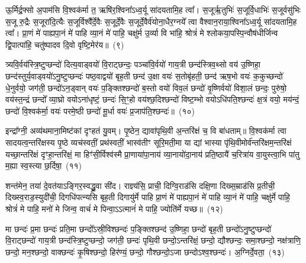 ऊ॒र्मिर्द्र॒फ्सो अ॒पाम॑सि वि॒श्वक॑र्मा त॒ ऋषि॑र॒श्विना᳚\-ऽ\-ध्व॒र्यू सा॑दयता\-मि॒ह त्वा᳚। स॒जूर्\mbox{}ऋ॒तुभिः॑ स॒जूर्वि॒धाभिः॑ स॒जूर्वसु॑भिः स॒जू रु॒द्रैः स॒जूरा॑दि॒त्यैः स॒जूर्विश्वै᳚र्दे॒वैः स॒जूर्दे॒वैः स॒जूर्दे॒वैर्व॑योना॒धैर॒ग्नये᳚ त्वा वैश्वान॒राया॒श्विना᳚\-ऽ\-ध्व॒र्यू सा॑दयतामि॒ह त्वा᳚। प्रा॒णं मे॑ पाह्यपा॒नं मे॑ पाहि व्या॒नं मे॑ पाहि॒ चक्षु॑र्म उ॒र्व्या वि भा॑हि॒ श्रोत्रं॑ मे श्लोकया॒पस्पि॒न्वौष॑धीर्जिन्व द्वि॒पात्पा॑हि॒ चतु॑ष्पादव दि॒वो वृष्टि॒मेर॑य॥~(९)

{\anuvakamend[{सु॒वीरं॒ भुव॑नानामु॒र्व्या स॒प्तद॑श च}]}%

त्र्यवि॒र्वय॑स्त्रि॒ष्टुप्छन्दो॑ दित्य॒वाड्वयो॑ वि॒राट्छन्दः॒ पञ्चा॑वि॒र्वयो॑ गाय॒त्री छन्द॑स्त्रिव॒थ्सो वय॑ उ॒ष्णिहा॒ छन्द॑स्तुर्य॒वाड्वयो॑\-ऽ\-नु॒ष्टुप्छन्दः॑ पष्ठ॒वाद्वयो॑ बृह॒ती छन्द॑ उ॒क्षा वयः॑ स॒तोबृ॑हती॒ छन्द॑ ऋष॒भो वयः॑ क॒कुच्छन्दो॑ धे॒नुर्वयो॒ जग॑ती॒ छन्दो॑\-ऽ\-न॒ड्वान् वयः॑ प॒ङ्क्तिश्छन्दो॑ ब॒स्तो वयो॑ विव॒लं छन्दो॑ वृ॒ष्णिर्वयो॑ विशा॒लं छन्दः॒ पुरु॑षो॒ वय॑स्त॒न्द्रं छन्दो᳚ व्या॒घ्रो वयो\-ऽ\-ना॑धृष्टं॒ छन्दः॑ सि॒ꣳ॒हो वय॑श्छ॒दिश्छन्दो॑ विष्ट॒म्भो वयो\-ऽधि॑\-पति॒श्छन्दः॑ क्ष॒त्रं वयो॒ मय॑न्दं॒ छन्दो॑ वि॒श्वक॑र्मा॒ वयः॑ परमे॒ष्ठी छन्दो॑ मू॒र्धा वयः॑ प्र॒जा\-प॑ति॒श्छन्दः॑॥~(१०)

{\anuvakamend[{पुरु॑षो॒ वयः॒ षड्विꣳ॑शतिश्च}]}%

इन्द्रा᳚ग्नी॒ अव्य॑थमाना॒मिष्ट॑कां दृꣳहतं यु॒वम्। पृ॒ष्ठेन॒ द्यावा॑\-पृथि॒वी अ॒न्तरि॑क्षं च॒ वि बा॑धताम्॥ वि॒श्वक॑र्मा त्वा सादयत्व॒न्त\-रि॑क्षस्य पृ॒ष्ठे व्यच॑स्वतीं॒ प्रथ॑स्वतीं॒ भास्व॑तीꣳ सूरि॒मती॒मा या द्यां भास्या पृ॑थि॒वीमोर्व॑न्तरि॑क्षम॒न्तरि॑क्षं यच्छा॒न्तरि॑क्षं दृꣳहा॒न्तरि॑क्षं॒ मा हिꣳ॑सी॒र्विश्व॑स्मै प्रा॒णाया॑पा॒नाय॑ व्या॒नायो॑दा॒नाय॑ प्रति॒ष्ठायै॑ च॒रित्रा॑य वा॒युस्त्वा॒भि पा॑तु म॒ह्या स्व॒स्त्या छ॒र्दिषा॒~(११)

शन्त॑मेन॒ तया॑ दे॒वत॑या\-ऽ\-ङ्गिर॒स्वद्ध्रु॒वा सी॑द। राज्ञ्य॑सि॒ प्राची॒ दिग्वि॒राड॑सि दक्षि॒णा दिख्स॒म्राड॑सि प्र॒तीची॒ दिख्स्व॒राड॒स्युदी॑ची॒ दिगधि॑पत्न्यसि बृह॒ती दिगायु॑र्मे पाहि प्रा॒णं मे॑ पाह्यपा॒नं मे॑ पाहि व्या॒नं मे॑ पाहि॒ चक्षु॑र्मे पाहि॒ श्रोत्रं॑ मे पाहि॒ मनो॑ मे जिन्व॒ वाचं॑ मे पिन्वा॒ऽऽत्मानं॑ मे पाहि॒ ज्योति॑र्मे यच्छ॥~(१२)

{\anuvakamend[{छ॒र्दिषा॑ पिन्व॒ षट्च॑}]}%

मा छन्दः॑ प्र॒मा छन्दः॑ प्रति॒मा छन्दो᳚\-ऽस्री॒विश्छन्दः॑ प॒ङ्क्तिश्छन्द॑ उ॒ष्णिहा॒ छन्दो॑ बृह॒ती छन्दो॑\-ऽनु॒ष्टुप्छन्दो॑ वि॒राट्छन्दो॑ गाय॒त्री छन्द॑स्\-त्रि॒ष्टुप्छन्दो॒ जग॑ती॒ छन्दः॑ पृथि॒वी छन्दो॒\-ऽन्तरि॑क्षं॒ छन्दो॒ द्यौश्छन्दः॒ समा॒श्छन्दो॒ नक्ष॑त्राणि॒ छन्दो॒ मन॒श्छन्दो॒ वाक्छन्दः॑ कृ॒षिश्छन्दो॒ हिर॑ण्यं॒ छन्दो॒ गौश्छन्दो॒\-ऽजा छन्दो\-ऽश्व॒श्छन्दः॑। अ॒ग्निर्दे॒वता॒~(१३)

